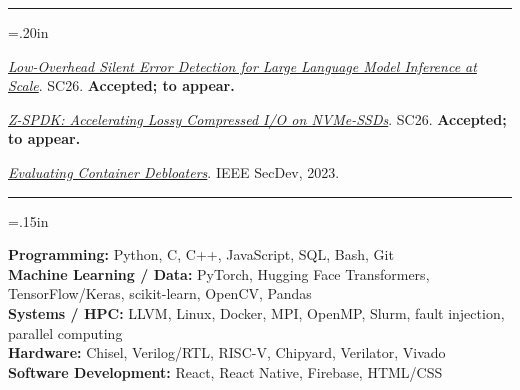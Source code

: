 \documentclass[letterpaper,11pt]{article}
\renewcommand{\section}[1]{\par\vspace{9pt}{\scshape\large #1\par}\vspace{2pt}\hrule\vspace{4pt}}
\newcommand{\resumeItem}[1]{\item\small{#1}}
\newcommand{\resumeItemListStart}{\begin{list}{\textbullet}{\leftmargin=.20in\itemsep=2pt\topsep=2pt\parsep=0pt\partopsep=0pt}}
\newcommand{\resumeItemListEnd}{\end{list}\vspace{-3pt}}
\begin{document}
\vspace{-8pt}
\section{Publications}
\resumeItemListStart
  \resumeItem{\href{https://sc26.conference-program.com/presentation/?id=pap435\&sess=sess228}{\textit{Low-Overhead Silent Error Detection for Large Language Model Inference at Scale}}. SC26. \textbf{Accepted; to appear.}}
  \resumeItem{\href{https://sc26.conference-program.com/presentation/?id=pap1023\&sess=sess202}{\textit{Z-SPDK: Accelerating Lossy Compressed I/O on NVMe-SSDs}}. SC26. \textbf{Accepted; to appear.}}
  \resumeItem{\href{https://doi.org/10.1109/SecDev56634.2023.00023}{\textit{Evaluating Container Debloaters}}. IEEE SecDev, 2023.}
\resumeItemListEnd

\vspace{-8pt}
\section{Technical Skills}
\begin{list}{}{\leftmargin=.15in\itemsep=0pt\topsep=1pt\parsep=0pt\partopsep=0pt}
  \small\item
  \textbf{Programming:} Python, C, C++, JavaScript, SQL, Bash, Git\\[1pt]
  \textbf{Machine Learning / Data:} PyTorch, Hugging Face Transformers, TensorFlow/Keras, scikit-learn, OpenCV, Pandas\\[1pt]
  \textbf{Systems / HPC:} LLVM, Linux, Docker, MPI, OpenMP, Slurm, fault injection, parallel computing\\[1pt]
  \textbf{Hardware:} Chisel, Verilog/RTL, RISC-V, Chipyard, Verilator, Vivado\\[1pt]
  \textbf{Software Development:} React, React Native, Firebase, HTML/CSS
\end{list}
\end{document}
